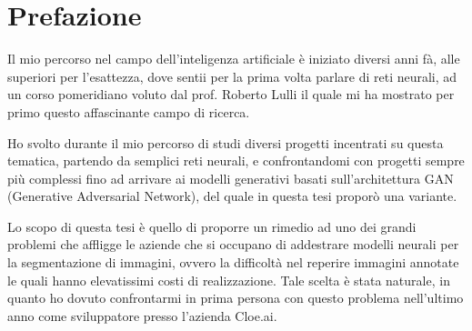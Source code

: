 \clearpage
\phantom{a}
\vfill


\chapter{Prefazione \ok \ok \ok}


\begin{flushleft}


\begin{comment}



\end{comment}


Il mio percorso nel campo dell'inteligenza artificiale è iniziato diversi anni fà, alle superiori per l'esattezza,
dove sentii per la prima volta parlare di reti neurali, ad un corso pomeridiano voluto dal prof. Roberto Lulli il quale mi ha mostrato per primo questo affascinante campo di ricerca.

Ho svolto durante il mio percorso di studi diversi progetti incentrati su questa tematica, partendo da semplici reti neurali,
e confrontandomi con progetti sempre più complessi fino ad arrivare ai modelli generativi basati sull'architettura GAN (Generative Adversarial Network),
del quale in questa tesi proporò una variante.

Lo scopo di questa tesi è quello di proporre un rimedio ad uno dei grandi problemi che affligge le aziende che si occupano di addestrare modelli neurali per la segmentazione di immagini,
ovvero la difficoltà nel reperire immagini annotate le quali hanno elevatissimi costi di realizzazione.
Tale scelta è stata naturale, in quanto ho dovuto confrontarmi in prima persona con questo problema nell'ultimo anno come sviluppatore presso l'azienda Cloe.ai.


\end{flushleft}



\vfill
\newpage